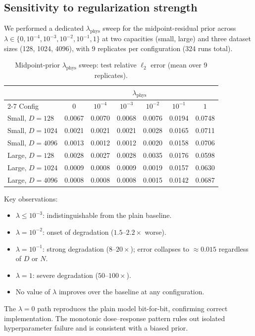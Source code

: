 \documentclass[11pt]{article}
\begin{document}
\subsection{Sensitivity to regularization strength}
\label{sec:results-lambda}

We performed a dedicated $\lambda_{\mathrm{phys}}$ sweep for the midpoint-residual prior across $\lambda \in \{0, 10^{-4}, 10^{-3}, 10^{-2}, 10^{-1}, 1\}$ at two capacities (small, large) and three dataset sizes (128, 1024, 4096), with 9 replicates per configuration (324 runs total).

\begin{table}[H]
    \centering
    \caption{Midpoint-prior $\lambda_{\mathrm{phys}}$ sweep: test relative $\ell_2$ error (mean over 9 replicates).}
    \label{tab:lambda-midpoint}
    \small
    \begin{tabular}{lcccccc}
        \toprule
        & \multicolumn{6}{c}{$\lambda_{\mathrm{phys}}$} \\
        \cmidrule(lr){2-7}
        Config & $0$ & $10^{-4}$ & $10^{-3}$ & $10^{-2}$ & $10^{-1}$ & $1$ \\
        \midrule
        Small, $D\!=\!128$  & 0.0067 & 0.0070 & 0.0068 & 0.0076 & 0.0194 & 0.0748 \\
        Small, $D\!=\!1024$ & 0.0021 & 0.0021 & 0.0021 & 0.0028 & 0.0165 & 0.0711 \\
        Small, $D\!=\!4096$ & 0.0013 & 0.0012 & 0.0012 & 0.0020 & 0.0158 & 0.0706 \\
        \midrule
        Large, $D\!=\!128$  & 0.0028 & 0.0027 & 0.0028 & 0.0035 & 0.0176 & 0.0598 \\
        Large, $D\!=\!1024$ & 0.0009 & 0.0008 & 0.0009 & 0.0019 & 0.0157 & 0.0630 \\
        Large, $D\!=\!4096$ & 0.0008 & 0.0008 & 0.0008 & 0.0015 & 0.0142 & 0.0687 \\
        \bottomrule
    \end{tabular}
\end{table}

Key observations:
\begin{itemize}[leftmargin=*]
    \item $\lambda \le 10^{-3}$: indistinguishable from the plain baseline.
    \item $\lambda = 10^{-2}$: onset of degradation ($1.5$--$2.2\times$ worse).
    \item $\lambda = 10^{-1}$: strong degradation ($8$--$20\times$); error collapses to $\approx 0.015$ regardless of $D$ or $N$.
    \item $\lambda = 1$: severe degradation ($50$--$100\times$).
    \item No value of $\lambda$ improves over the baseline at any configuration.
\end{itemize}
The $\lambda = 0$ path reproduces the plain model bit-for-bit, confirming correct implementation.
The monotonic dose--response pattern rules out isolated hyperparameter failure and is consistent with a biased prior.
\end{document}
